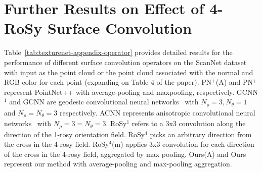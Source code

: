 \section{Further Results on Effect of 4-RoSy Surface Convolution}
\label{appendix:4rosy}
Table~\ref{tab:texturenet-appendix-operator} provides detailed results for the performance of different surface convolution operators on the ScanNet dataset~\cite{dai2017scannet} with input as the point cloud or the point cloud associated with the normal and RGB color for each point (expanding on Table 4 of the paper).    
PN$^+$(A) and PN$^+$ represent PointNet++ with average-pooling and maxpooling, respectively. GCNN$^1$ and GCNN are geodesic convolutional neural networks~\cite{masci2015geodesic} with $N_\rho=3,N_\theta=1$ and $N_\rho=N_\theta=3$ respectively. 
ACNN represents anisotropic convolutional neural networks~\cite{boscaini2016learning} with $N_\rho=3=N_\theta=3$. RoSy$^1$ refers to a 3x3 convolution along the direction of the 1-rosy orientation field. 
RoSy$^4$ picks an arbitrary direction from the cross in the 4-rosy field. RoSy$^4$(m) applies 3x3 convolution for each direction of the cross in the 4-rosy field, aggregated by max pooling. 
Ours(A) and Ours represent our method with average-pooling and max-pooling aggregation.
